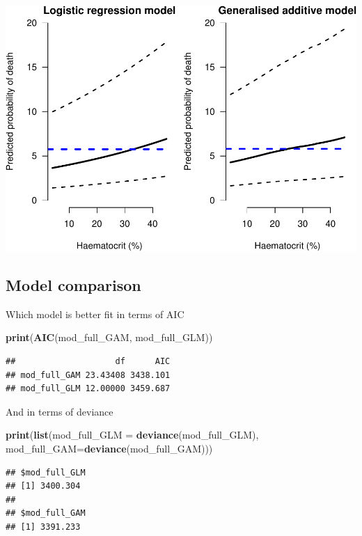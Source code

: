 \documentclass[]{article}
\newenvironment{Shaded}{\begin{snugshade}}{\end{snugshade}}
\newcommand{\KeywordTok}[1]{\textcolor[rgb]{0.13,0.29,0.53}{\textbf{#1}}}
\newcommand{\DataTypeTok}[1]{\textcolor[rgb]{0.13,0.29,0.53}{#1}}
\newcommand{\NormalTok}[1]{#1}
\begin{document}
\includegraphics{LegacyAnalysis_files/figure-latex/counterfactualPlots-1.pdf}

\subsection{Model comparison}\label{model-comparison}

Which model is better fit in terms of AIC

\begin{Shaded}
\begin{Highlighting}[]
\KeywordTok{print}\NormalTok{(}\KeywordTok{AIC}\NormalTok{(mod_full_GAM, mod_full_GLM))}
\end{Highlighting}
\end{Shaded}

\begin{verbatim}
##                    df      AIC
## mod_full_GAM 23.43408 3438.101
## mod_full_GLM 12.00000 3459.687
\end{verbatim}

And in terms of deviance

\begin{Shaded}
\begin{Highlighting}[]
\KeywordTok{print}\NormalTok{(}\KeywordTok{list}\NormalTok{(}\DataTypeTok{mod_full_GLM =} \KeywordTok{deviance}\NormalTok{(mod_full_GLM), }\DataTypeTok{mod_full_GAM=}\KeywordTok{deviance}\NormalTok{(mod_full_GAM)))}
\end{Highlighting}
\end{Shaded}

\begin{verbatim}
## $mod_full_GLM
## [1] 3400.304
## 
## $mod_full_GAM
## [1] 3391.233
\end{verbatim}
\end{document}
